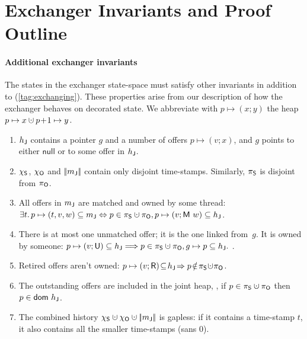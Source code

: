 
\section{Exchanger Invariants and Proof Outline}
\label{app:exch}


%

\paragraph{Additional exchanger invariants}

The states in the exchanger state-space must satisfy other invariants
in addition to (\ref{tag:exchanging}). These properties arise from our
description of how the exchanger behaves on decorated state. We
abbreviate with $p \mapsto (x; y)$ the heap
$p \mapsto x \hunion p\!+\!1 \mapsto y$.

\begin{enumerate}[label=(\roman*)]
\item\label{exP} $h_{\mathsf{J}}$ contains a pointer $g$ and a number of
  offers $p \mapsto (v; x)$, and $g$ points to either $\mathsf{null}$
  or to some offer in $h_{\mathsf{J}}$.

\item $\chi_{\mathsf{S}}$, $\chi_{\mathsf{O}}$ and $|\!|{{m_{\mathsf{J}}}}|\!|$ contain only
  disjoint time-stamps. Similarly, $\pi_{\mathsf{S}}$ is disjoint from $\pi_{\mathsf{O}}$.

\item\label{matched} All offers in ${m_{\mathsf{J}}}$ are matched and owned
  by some thread:
%
  {\small$\exists t\ldot p \mapsto (t, v, w) \subseteq \pending
    \Leftrightarrow p \in \perms \hunion \permo, p \mapsto (v;
    \Matched w) \subseteq \heapj $}.

\item There is at most one unmatched offer; it is the one linked
  from~$g$. It is owned by someone:
%
  {\small{
      $p \mapsto (v; \Unmatched) \subseteq \heapj \Longrightarrow p
      \in \perms \hunion \permo, g \mapsto p \subseteq \heapj.  $ }}.

\item Retired offers aren't owned:
  {\small{$p \mapsto (v; \Retired)\!\subseteq\!\heapj\!\Rightarrow
    p\!\notin\!\perms\!\hunion\!\permo$}}.

\item The outstanding offers are included in the joint heap, \ie, if
  $p \in \perms \hunion \permo$ then $p \in \mathsf{dom}\ h_{\mathsf{J}}$.

\item\label{ex:gapless} The combined history
  $\hists \hunion \histo \hunion \mygather{\pending}$ is gapless: if
  it contains a time-stamp $t$, it also contains all the smaller
  time-stamps (sans 0).

\end{enumerate}

